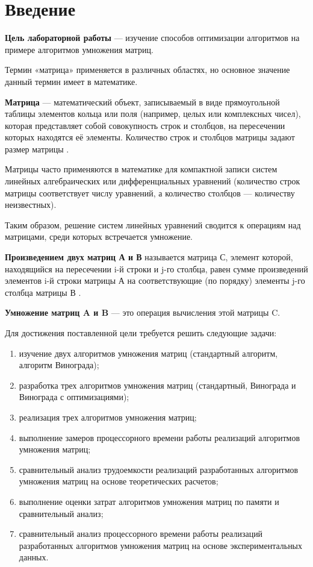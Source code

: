 \chapter*{Введение}
\textbf{Цель лабораторной работы} --- изучение способов оптимизации алгоритмов на примере алгоритмов умножения матриц.

Термин «матрица» применяется в различных областях, но основное значение данный термин имеет в математике.

\textbf{Матрица} --- математический объект, записываемый в виде прямоугольной таблицы элементов кольца или поля (например, целых или комплексных чисел), которая представляет собой совокупность строк и столбцов, на пересечении которых находятся её элементы. Количество строк и столбцов матрицы задают размер матрицы \cite{matrix}.

Матрицы часто применяются в математике для компактной записи систем линейных алгебраических или дифференциальных уравнений (количество строк матрицы соответствует числу уравнений, а количество столбцов --- количеству неизвестных).

Таким образом, решение систем линейных уравнений сводится к операциям над матрицами, среди которых встречается умножение.

\textbf{Произведением двух матриц А и В} называется матрица С, элемент которой, находящийся на пересечении i-й строки и j-го столбца, равен сумме произведений элементов i-й строки матрицы А на соответствующие (по порядку) элементы j-го столбца матрицы В \cite{matrix2}.

\textbf{Умножение матриц A и B} --- это операция вычисления этой матрицы C.

Для достижения поставленной цели требуется решить следующие задачи:
\begin{enumerate}[label={\arabic*)}]
    \item изучение двух алгоритмов умножения матриц (стандартный алгоритм, алгоритм Винограда);
    \item разработка трех алгоритмов умножения матриц (стандартный, Винограда и Винограда с оптимизациями);
    \item реализация трех алгоритмов умножения матриц;
    \item выполнение замеров процессорного времени работы реализаций алгоритмов умножения матриц;
	\item сравнительный анализ трудоемкости реализаций разработанных алгоритмов умножения матриц на основе теоретических расчетов;
	\item выполнение оценки затрат алгоритмов умножения матриц по памяти и сравнительный анализ;
	\item сравнительный анализ процессорного времени работы реализаций разработанных алгоритмов умножения матриц на основе экспериментальных данных.
\end{enumerate}
